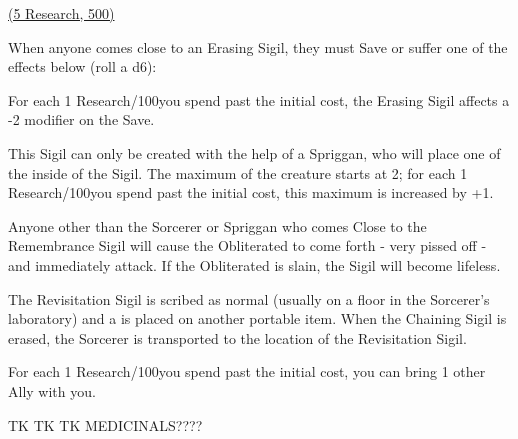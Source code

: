 {\large{\underline{ (5 Research, 500\AU)}}\normalsize



When anyone comes close to an Erasing Sigil, they must Save or suffer one of the effects below (roll a d6):


For each 1 Research/100\AU you spend past the initial cost, the Erasing Sigil affects a -2 modifier on the Save.

\cbreak


This Sigil can only be created with the help of a Spriggan, who will place one of the  inside of the Sigil.  The maximum \HD of the creature starts at 2; for each 1 Research/100\AU you spend past the initial cost, this maximum is increased by +1.

Anyone other than the Sorcerer or Spriggan who comes Close to the Remembrance Sigil will cause the Obliterated to come forth - very pissed off - and immediately attack.  If the Obliterated is slain, the Sigil will become lifeless.



The Revisitation Sigil is scribed as normal (usually on a floor in the Sorcerer's laboratory) and a  is placed on another portable item.  When the Chaining Sigil is erased, the Sorcerer is transported to the location of the Revisitation Sigil.  

For each 1 Research/100\AU you spend past the initial cost, you can bring 1 other Ally with you.

\newpage

TK TK TK MEDICINALS????









}%
